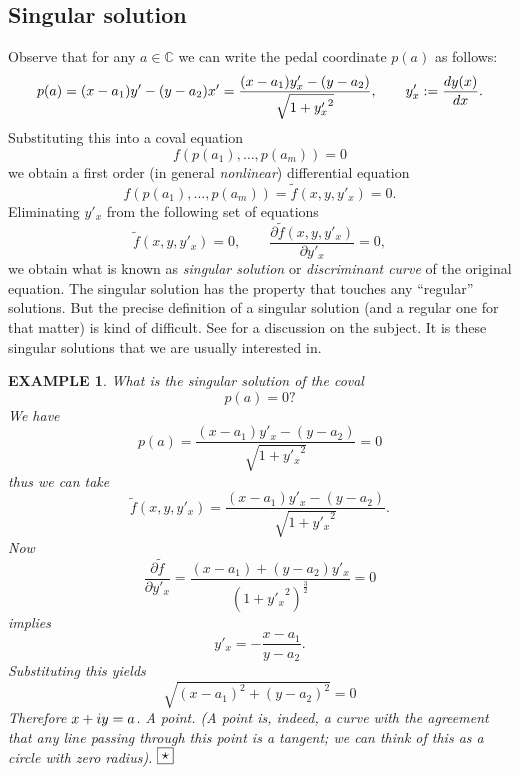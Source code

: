 \documentclass[10pt,a4paper,reqno]{amsart}
\newtheorem{exa}[defi]{\bf E\scriptsize XAMPLE \normalsize}
\def\kopr{\hfill\raisebox{3pt}{\framebox{$\star$}}}
\newenvironment{example}{\begin{exa}\rm}{$\kopr$\end{exa}}
\newcommand{\zav}[1]{\left( #1 \right)}
\newcommand{\imag}{{\rm i}}
\begin{document}
\subsection{Singular solution}
Observe that for any $a\in\mathbb{C}$ we can write the pedal coordinate $p(a)$ as follows:
\begin{equation}\label{difsubs}
p(a)=(x-a_1)y'-(y-a_2)x'=\frac{(x-a_1)y'_x-(y-a_2)}{\sqrt{1+{y'_x}^2}}, \qquad y'_x:=\frac{{\rm d} y(x)}{{\rm d} x}.
\end{equation}
Substituting this into a coval equation
$$
f(p(a_1),\dots, p(a_m))=0
$$
we obtain a first order (in general \textit{nonlinear}) differential equation
$$
f(p(a_1),\dots, p(a_m))=\tilde f\zav{x,y,y'_x}=0.
$$
Eliminating $y'_x$ from the following set of equations
\begin{equation}\label{singsoleq}
\tilde f\zav{x,y,y'_x}=0,\qquad \frac{\partial\tilde f(x,y,y'_x)}{\partial y'_x}=0,
\end{equation}
we obtain what is known as \textit{singular solution} or \textit{discriminant curve} of the original equation. The singular solution has the property that touches any ``regular'' solutions. But the precise definition of a singular solution (and a regular one for that matter) is kind of difficult. See \cite{izumiya} for a discussion on the subject. It is these singular solutions that we are usually interested in.
\begin{example}
What is the singular solution of the coval
$$
p(a)=0?
$$
We have
$$
p(a)=\frac{(x-a_1)y'_x-(y-a_2)}{\sqrt{1+{y'_x}^2}}=0
$$
thus we can take
$$
\tilde f(x,y,y'_x)=\frac{(x-a_1)y'_x-(y-a_2)}{\sqrt{1+{y'_x}^2}}.
$$
Now
$$
\frac{\partial\tilde f}{\partial y'_x}=\frac{(x-a_1)+(y-a_2)y'_x}{\zav{1+{y'_x}^2}^\frac32}=0
$$
implies 
$$
y'_x=-\frac{x-a_1}{y-a_2}.
$$
Substituting this yields
$$
\sqrt{(x-a_1)^2+(y-a_2)^2}=0
$$
Therefore $x+\imag y=a$. A point. 
(A point is, indeed, a curve with the agreement that any line passing through this point is a tangent; we can think of this as a circle with zero radius).  
\end{example}
\end{document}
